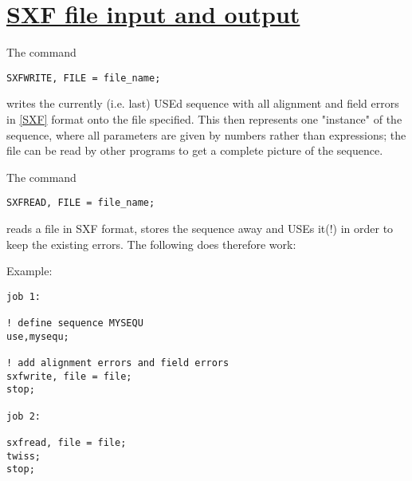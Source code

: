 
\chapter{\href{sxf}{SXF file input and output}} 
The command 
\begin{verbatim}
SXFWRITE, FILE = file_name;
\end{verbatim} 
writes the currently (i.e. last) USEd sequence with all alignment and
field errors in \href{../Introduction/bibliography.html#SXF}{[SXF]}
format onto the file specified. This then represents one "instance" of
the sequence, where all parameters are given by numbers rather than
expressions; the file can be read by other programs to get a complete
picture of the sequence.  

The command 
\begin{verbatim}
SXFREAD, FILE = file_name;
\end{verbatim} 
reads a file in SXF format, stores the sequence away and USEs it(!) in
order to keep the existing errors. The following does therefore work:  

Example: 
\begin{verbatim}
job 1:

! define sequence MYSEQU
use,mysequ;

! add alignment errors and field errors
sxfwrite, file = file;
stop;

job 2:

sxfread, file = file;
twiss;
stop;
\end{verbatim}


